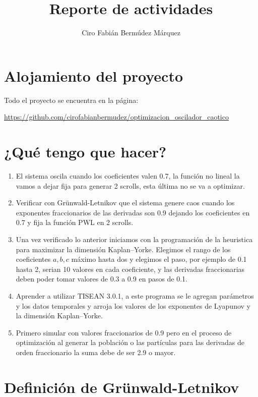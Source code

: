 \documentclass[10pt,a4paper]{article}
\author{Ciro Fabián Bermúdez Márquez}
\title{Reporte de actividades}
\begin{document}
\maketitle
	\section{Alojamiento del proyecto}
	Todo el proyecto se encuentra en la página:
	
	\begin{center}
		\url{https://github.com/cirofabianbermudez/optimizacion_oscilador_caotico}
	\end{center}
	\section{¿Qué tengo que hacer?}	
	
	\begin{enumerate}
		\item El sistema oscila cuando los coeficientes valen 0.7,  la función no lineal la vamos a dejar fija para generar 2 scrolls, esta última no se va a optimizar.
		
		\item Verificar con Grünwald-Letnikov que el sistema genere caos cuando los exponentes fraccionarios de las derivadas son 0.9 dejando los coeficientes en 0.7 y fija la función PWL en 2 scrolls. 
		
		\item Una vez verificado lo anterior iniciamos con la programación de la heuristica para maximizar la dimensión Kaplan–Yorke. Elegimos el rango de los coeficientes $a,b,c$ máximo hasta dos y elegimos el paso, por ejemplo de 0.1 hasta 2, serian 10 valores en cada coeficiente, y las derivadas fraccionarias deben poder tomar valores de 0.3 a 0.9 en pasos de 0.1.
		
		\item Aprender a utilizar TISEAN 3.0.1, a este programa se le agregan parámetros y los datos temporales y arroja los valores de los exponentes de Lyapunov y la dimensión Kaplan–Yorke.
	
		\item Primero simular con valores fraccionarios de 0.9 pero en el proceso de optimización al generar la población o las partículas para las derivadas de orden fraccionario la suma debe de ser 2.9 o mayor. 
	\end{enumerate}
	
			
	\section{Definición de Grünwald-Letnikov}
\end{document}
